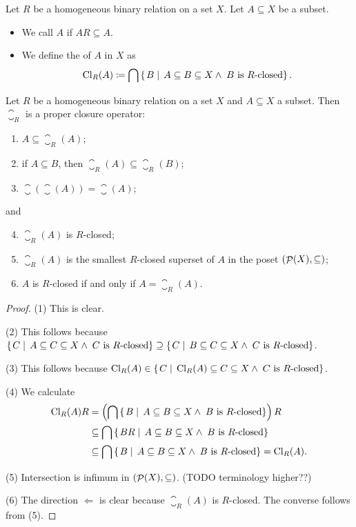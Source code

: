 \begin{definition}
Let $R$ be a homogeneous binary relation on a set $X$. Let $A\subseteq X$ be a subset.
\begin{itemize}
\item We call $A$  if $AR \subseteq A$.
\item We define the  of $A$ in $X$ as
\[ \operatorname{Cl}_R(A) \coloneqq \bigcap \left\{\left. B \;\right|\; A \subseteq B \subseteq X \land \;\text{$B$ is $R$-closed} \right\}. \]
\end{itemize}
\end{definition}

\begin{proposition} \label{RclosureIsClosure}
Let $R$ be a homogeneous binary relation on a set $X$ and $A\subseteq X$ a subset. Then $\closure_R$ is a proper closure operator:
\begin{enumerate}
\item $A \subseteq \closure_R(A)$;
\item if $A\subseteq B$, then $\closure_R(A) \subseteq \closure_R(B)$;
\item $\closure(\closure(A)) = \closure(A)$;
\end{enumerate}
and
\begin{enumerate} \setcounter{enumi}{3}
\item $\closure_R(A)$ is $R$-closed;
\item $\closure_R(A)$ is the smallest $R$-closed superset of $A$ in the poset $\left( \mathop{\mathcal{P}}(X),\subseteq \right)$;
\item $A$ is $R$-closed \textup{if and only if} $A = \closure_R(A)$.
\end{enumerate}
\end{proposition}
\begin{proof}
(1) This is clear.

(2) This follows because $\left\{\left. C \;\right|\; A \subseteq C \subseteq X \land \;\text{$C$ is $R$-closed} \right\} \supseteq \left\{\left. C \;\right|\; B \subseteq C \subseteq X \land \;\text{$C$ is $R$-closed} \right\}$.

(3) This follows because $\operatorname{Cl}_R(A) \in \left\{\left. C \;\right|\; \operatorname{Cl}_R(A) \subseteq C \subseteq X \land \;\text{$C$ is $R$-closed} \right\}$.

(4) We calculate
\begin{align*}
\operatorname{Cl}_R(A)R &= \left(\bigcap \left\{\left. B \;\right|\; A \subseteq B \subseteq X \land \;\text{$B$ is $R$-closed} \right\}\right)R \\
&\subseteq \bigcap \left\{\left. BR \;\right|\; A \subseteq B \subseteq X \land \;\text{$B$ is $R$-closed} \right\} \\
&\subseteq \bigcap \left\{\left. B \;\right|\; A \subseteq B \subseteq X \land \;\text{$B$ is $R$-closed} \right\} = \operatorname{Cl}_R(A).
\end{align*}

(5) Intersection is infimum in $\left( \mathop{\mathcal{P}}(X),\subseteq \right)$. (TODO terminology higher??)

(6) The direction $\Leftarrow$ is clear because $\closure_R(A)$ is $R$-closed. The converse follows from (5).
\end{proof}

